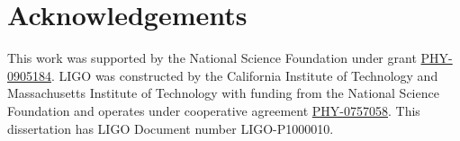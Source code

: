 \chapter*{Acknowledgements}

This work was supported by the National Science Foundation under grant
\href{http://www.nsf.gov/awardsearch/showAward.do?AwardNumber=0905184}{PHY-0905184}.
LIGO was constructed by the California Institute of Technology and
Massachusetts Institute of Technology with funding from the National
Science Foundation and operates under cooperative agreement
\href{http://www.nsf.gov/awardsearch/showAward.do?AwardNumber=0757058}{PHY-0757058}.
This dissertation has LIGO Document number LIGO-P1000010.

